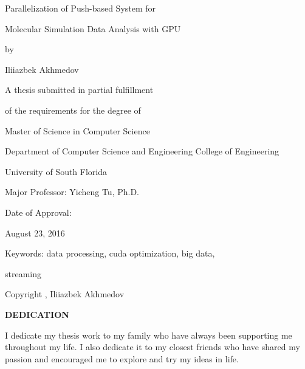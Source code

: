 \documentclass[12pt,letterpaper]{report}
\newcommand\frontmatter{%
    \cleardoublepage
  \pagenumbering{roman}}
\begin{document}
{
\frontmatter\thispagestyle{empty}\linespread{1}\selectfont\centering\vspace*{4\baselineskip}
Parallelization of Push-based System for 

\vspace*{1\baselineskip}

Molecular Simulation Data Analysis with GPU 
\vspace*{3\baselineskip}

{ by }

\vspace*{3\baselineskip}

{ Iliiazbek Akhmedov }

\vspace*{5\baselineskip}

A thesis submitted in partial fulfillment 

of the requirements for the degree of 

Master of Science in Computer Science 

Department of Computer Science and Engineering College of Engineering 

University of South Florida

\vspace*{3\baselineskip}
Major Professor:  Yicheng Tu, Ph.D.

\vspace*{2\baselineskip}
Date of Approval:

August 23, 2016

\vspace*{3\baselineskip}
Keywords: data processing, cuda optimization, big data,

streaming

\vspace*{1\baselineskip}
Copyright \textcopyright{}, Iliiazbek Akhmedov

}

\linespread{1}\selectfont\clearpage
\thispagestyle{empty}
\centering
\linespread{1}\selectfont
\vspace*{3\baselineskip}
\textbf{DEDICATION}
\linespread{2}\selectfont
\begin{flushleft}
\hspace{3em} I dedicate my thesis work to my family who have always been supporting me throughout my life. I also dedicate it to my closest friends who have shared my passion and encouraged me to explore and try my ideas in life.
\end{flushleft}

\clearpage
\end{document}
